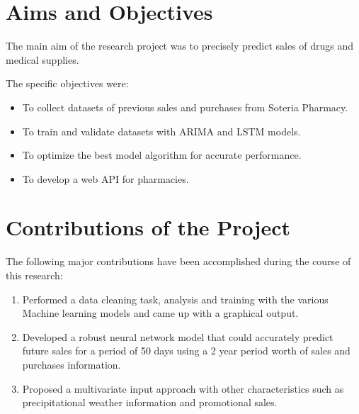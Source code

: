 \documentclass[12pt]{report}
\begin{document}
\section{Aims and Objectives}
The main aim of the research project was to precisely predict sales of drugs and medical supplies.

The specific objectives  were:

\begin{itemize}[topsep=0pt]

\item To collect datasets of previous sales and purchases from Soteria Pharmacy.

\item To train and validate datasets with ARIMA and LSTM models.

\item To optimize the best model algorithm for accurate performance.

\item To develop  a web API for pharmacies.

\end{itemize}













\section{Contributions of the Project}

The following major contributions have been accomplished during the course of this research:

\begin{enumerate}[topsep=0pt]

\item Performed a data cleaning task, analysis and training with the various Machine learning models and came up with a graphical output.

\item Developed a robust neural network model that could accurately predict future sales for a period of 50 days using a 2 year period worth of sales and purchases information.

\item Proposed a multivariate input approach with other characteristics such as precipitational weather information and promotional sales.

\end{enumerate}
\end{document}
